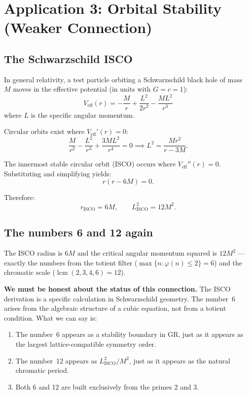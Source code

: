 \documentclass[preprint]{revtex4-2}
\DeclareMathOperator{\lcm}{lcm}
\begin{document}
\section{Application 3: Orbital Stability (Weaker Connection)}\label{sec:orbits}

\subsection{The Schwarzschild ISCO}

In general relativity, a test particle orbiting a Schwarzschild black hole of mass~$M$ moves in the effective potential (in units with $G = c = 1$):
\begin{equation}
V_{\text{eff}}(r) = -\frac{M}{r} + \frac{L^2}{2r^2} - \frac{ML^2}{r^3}
\end{equation}
where $L$ is the specific angular momentum.

Circular orbits exist where $V_{\text{eff}}'(r) = 0$:
\begin{equation}
\frac{M}{r^2} - \frac{L^2}{r^3} + \frac{3ML^2}{r^4} = 0 \implies L^2 = \frac{Mr^2}{r - 3M}.
\end{equation}

The innermost stable circular orbit (ISCO) occurs where $V_{\text{eff}}''(r) = 0$. Substituting and simplifying yields:
\begin{equation}
r(r - 6M) = 0.
\end{equation}

Therefore:
\begin{equation}\label{eq:isco}
\boxed{r_{\text{ISCO}} = 6M, \qquad L^2_{\text{ISCO}} = 12M^2.}
\end{equation}

\subsection{The numbers 6 and 12 again}

The ISCO radius is $6M$ and the critical angular momentum squared is $12M^2$ --- exactly the numbers from the totient filter ($\max\{n : \varphi(n) \leq 2\} = 6$) and the chromatic scale ($\lcm(2,3,4,6) = 12$).

\textbf{We must be honest about the status of this connection.} The ISCO derivation is a specific calculation in Schwarzschild geometry. The number~6 arises from the algebraic structure of a cubic equation, not from a totient condition. What we can say is:

\begin{enumerate}
\item The number~6 appears as a stability boundary in GR, just as it appears as the largest lattice-compatible symmetry order.
\item The number~12 appears as $L^2_{\text{ISCO}}/M^2$, just as it appears as the natural chromatic period.
\item Both 6 and 12 are built exclusively from the primes 2 and 3.
\end{enumerate}
\end{document}

